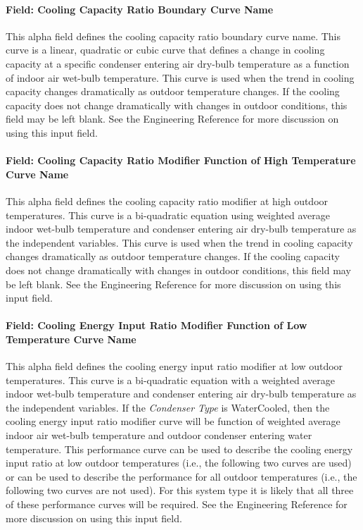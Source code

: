 \paragraph{Field: Cooling Capacity Ratio Boundary Curve Name}\label{field-cooling-capacity-ratio-boundary-curve-name}

This alpha field defines the cooling capacity ratio boundary curve name. This curve is a linear, quadratic or cubic curve that defines a change in cooling capacity at a specific condenser entering air dry-bulb temperature as a function of indoor air wet-bulb temperature. This curve is used when the trend in cooling capacity changes dramatically as outdoor temperature changes. If the cooling capacity does not change dramatically with changes in outdoor conditions, this field may be left blank. See the Engineering Reference for more discussion on using this input field.

\paragraph{Field: Cooling Capacity Ratio Modifier Function of High Temperature Curve Name}\label{field-cooling-capacity-ratio-modifier-function-of-high-temperature-curve-name}

This alpha field defines the cooling capacity ratio modifier at high outdoor temperatures. This curve is a bi-quadratic equation using weighted average indoor wet-bulb temperature and condenser entering air dry-bulb temperature as the independent variables. This curve is used when the trend in cooling capacity changes dramatically as outdoor temperature changes. If the cooling capacity does not change dramatically with changes in outdoor conditions, this field may be left blank. See the Engineering Reference for more discussion on using this input field.

\paragraph{Field: Cooling Energy Input Ratio Modifier Function of Low Temperature Curve Name}\label{field-cooling-energy-input-ratio-modifier-function-of-low-temperature-curve-name}

This alpha field defines the cooling energy input ratio modifier at low outdoor temperatures. This curve is a bi-quadratic equation with a weighted average indoor wet-bulb temperature and condenser entering air dry-bulb temperature as the independent variables. If the \textit{Condenser Type} is WaterCooled, then the cooling energy input ratio modifier curve will be function of weighted average indoor air wet-bulb temperature and outdoor condenser entering water temperature. This performance curve can be used to describe the cooling energy input ratio at low outdoor temperatures (i.e., the following two curves are used) or can be used to describe the performance for all outdoor temperatures (i.e., the following two curves are not used). For this system type it is likely that all three of these performance curves will be required. See the Engineering Reference for more discussion on using this input field.

